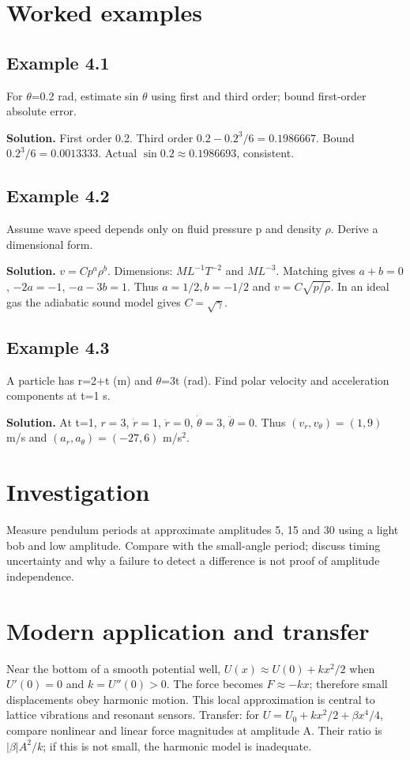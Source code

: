 \documentclass[11pt,a4paper,openany]{book}
\begin{document}
\section{Worked examples}
\subsection*{Example 4.1}
For \ensuremath{\theta}=0.2 rad, estimate sin \ensuremath{\theta} using first and third order; bound first-order absolute error.

\textbf{Solution.} First order 0.2. Third order $0.2-0.2^3/6=0.1986667$. Bound $0.2^3/6=0.0013333$. Actual $\sin0.2\approx0.1986693$, consistent.
\subsection*{Example 4.2}
Assume wave speed depends only on fluid pressure p and density \ensuremath{\rho}. Derive a dimensional form.

\textbf{Solution.} $v=Cp^a\rho^b$. Dimensions: $ML^{-1}T^{-2}$ and $ML^{-3}$. Matching gives $a+b=0$, $-2a=-1$, $-a-3b=1$. Thus $a=1/2,b=-1/2$ and $v=C\sqrt{p/\rho}$. In an ideal gas the adiabatic sound model gives $C=\sqrt\gamma$.
\subsection*{Example 4.3}
A particle has r=2+t (m) and \ensuremath{\theta}=3t (rad). Find polar velocity and acceleration components at t=1 s.

\textbf{Solution.} At t=1, $r=3$, $\dot r=1$, $\ddot r=0$, $\dot\theta=3$, $\ddot\theta=0$. Thus $(v_r,v_\theta)=(1,9)$ m/s and $(a_r,a_\theta)=(-27,6)$ m/s$^2$.
\section{Investigation}
Measure pendulum periods at approximate amplitudes 5\textdegree{}, 15\textdegree{} and 30\textdegree{} using a light bob and low amplitude. Compare with the small-angle period; discuss timing uncertainty and why a failure to detect a difference is not proof of amplitude independence.
\section{Modern application and transfer}
Near the bottom of a smooth potential well, $U(x)\approx U(0)+kx^2/2$ when $U'(0)=0$ and $k=U''(0)>0$. The force becomes $F\approx-kx$; therefore small displacements obey harmonic motion. This local approximation is central to lattice vibrations and resonant sensors. Transfer: for $U=U_0+kx^2/2+\beta x^4/4$, compare nonlinear and linear force magnitudes at amplitude A. Their ratio is $|\beta|A^2/k$; if this is not small, the harmonic model is inadequate.
\end{document}
